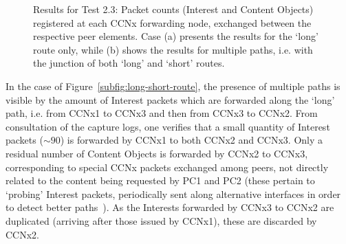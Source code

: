 \begin{figure}[h!]
    \centering



    \cprotect\caption{Results for Test 2.3: Packet counts (Interest and 
        Content Objects) registered at each CCNx forwarding node, exchanged 
        between the respective peer elements. Case (a) presents the results 
        for the `long' route only, while (b) shows the results for multiple 
        paths, i.e. with the junction of both `long' and `short' routes.}
    \label{fig:routes-pckt-counts}

\end{figure}

In the case of Figure~\ref{subfig:long-short-route}, the presence of multiple 
paths is visible by the amount of Interest packets which are forwarded along 
the `long' path, i.e. from CCNx1 to CCNx3 and then from CCNx3 to CCNx2. From 
consultation of the capture logs, one verifies that a small quantity of 
Interest packets ($\sim 90$) is forwarded by CCNx1 to both CCNx2 and CCNx3. 
Only a residual number of Content Objects is forwarded by 
CCNx2 to CCNx3, corresponding to special CCNx packets exchanged among peers, 
not directly related to the content being requested by PC1 and PC2 (these 
pertain to `probing' Interest packets, periodically sent along alternative 
interfaces in order to detect better paths~\cite{Yi2013}). As the 
Interests forwarded by CCNx3 to CCNx2 are duplicated (arriving after those 
issued by CCNx1), these are discarded by CCNx2.


